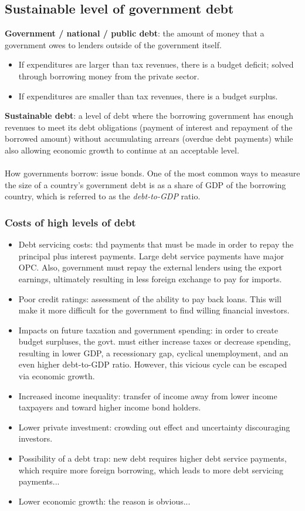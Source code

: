 \documentclass[a4paper,12pt]{article}
\newcommand{\needbold}[1]{\textcolor{red!70!black}{\textbf{#1}}}
\begin{document}
\subsection{Sustainable level of government debt}
\needbold{Government / national / public debt}: the amount of money that a government owes to lenders outside of the government itself.
\begin{itemize}
  \item If expenditures are larger than tax revenues, there is a budget deficit; solved through borrowing money from the private sector.
  \item If expenditures are smaller than tax revenues, there is a budget surplus.
\end{itemize}
\needbold{Sustainable debt}: a level of debt where the borrowing government has enough revenues to meet its debt obligations (payment of interest and repayment of the borrowed amount) without accumulating arrears (overdue debt payments) while also allowing economic growth to continue at an acceptable level.
\\\\How governments borrow: issue bonds. One of the most common ways to measure the size of a country's government debt is as a share of GDP of the borrowing country, which is referred to as the \emph{debt-to-GDP} ratio.
\subsubsection*{Costs of high levels of debt}
\begin{itemize}
  \item Debt servicing costs: thd payments that must be made in order to repay the principal plus interest payments. Large debt service payments have major OPC. Also, government must repay the external lenders using the export earnings, ultimately resulting in less foreign exchange to pay for imports.
  \item Poor credit ratings: assessment of the ability to pay back loans. This will make it more difficult for the government to find willing financial investors.
  \item Impacts on future taxation and government spending: in order to create budget surpluses, the govt. must either increase taxes or decrease spending, resulting in lower GDP, a recessionary gap, cyclical unemployment, and an even higher debt-to-GDP ratio. However, this vicious cycle can be escaped via economic growth.
  \item Increased income inequality: transfer of income away from lower income taxpayers and toward higher income bond holders.
  \item Lower private investment: crowding out effect and uncertainty discouraging investors.
  \item Possibility of a debt trap: new debt requires higher debt service payments, which require more foreign borrowing, which leads to more debt servicing payments...
  \item Lower economic growth: the reason is obvious...
\end{itemize}
\end{document}

